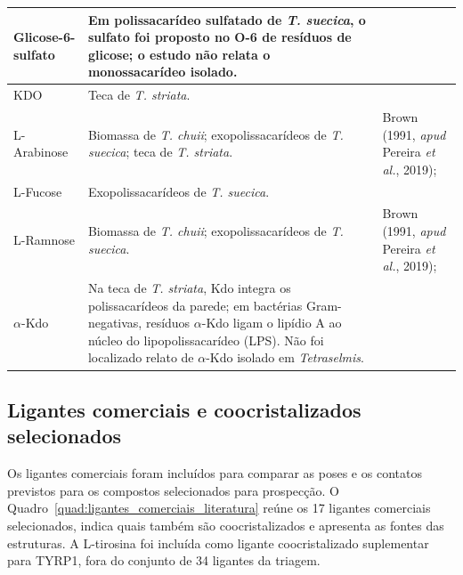 \begin{table}[H]
\begin{tabular}{|C{3.0cm}|C{8.2cm}|C{4.0cm}|}
\hline
Glicose-6-sulfato & Em polissacarídeo sulfatado de \textit{T. suecica}, o sulfato foi proposto no O-6 de resíduos de glicose; o estudo não relata o monossacarídeo isolado. & \textcite{li2026tetraselmis} \\
\hline
KDO & Teca de \textit{T. striata}. & \textcite{becker1989} \\
\hline
L-Arabinose & Biomassa de \textit{T. chuii}; exopolissacarídeos de \textit{T. suecica}; teca de \textit{T. striata}. & Brown (1991, \textit{apud} Pereira \textit{et al.}, 2019); \textcite{parra2020,becker1989} \\
\hline
L-Fucose & Exopolissacarídeos de \textit{T. suecica}. & \textcite{parra2020} \\
\hline
L-Ramnose & Biomassa de \textit{T. chuii}; exopolissacarídeos de \textit{T. suecica}. & Brown (1991, \textit{apud} Pereira \textit{et al.}, 2019); \textcite{parra2020} \\
\hline
$\alpha$-Kdo & Na teca de \textit{T. striata}, Kdo integra os polissacarídeos da parede; em bactérias Gram-negativas, resíduos $\alpha$-Kdo ligam o lipídio A ao núcleo do lipopolissacarídeo (LPS). Não foi localizado relato de $\alpha$-Kdo isolado em \textit{Tetraselmis}. & \textcite{becker1989,becker1998tetraselmis,ovchinnikova2016} \\
\hline
\end{tabular}
\end{table}
\subsection{Ligantes comerciais e coocristalizados selecionados}
Os ligantes comerciais foram incluídos para comparar as poses e os contatos previstos para os compostos selecionados para prospecção. O Quadro~\ref{quad:ligantes_comerciais_literatura} reúne os 17 ligantes comerciais selecionados, indica quais também são coocristalizados e apresenta as fontes das estruturas. A L-tirosina foi incluída como ligante coocristalizado suplementar para TYRP1, fora do conjunto de 34 ligantes da triagem.

